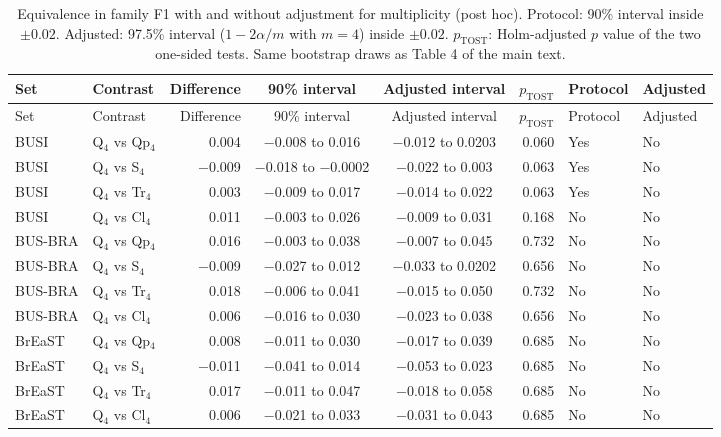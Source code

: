 \begin{longtable}{@{}llrccrll@{}}
\caption{Equivalence in family F1 with and without adjustment for multiplicity (post hoc). Protocol: 90\% interval inside $\pm0.02$. Adjusted: 97.5\% interval ($1-2\alpha/m$ with $m=4$) inside $\pm0.02$. $p_{\mathrm{TOST}}$: Holm-adjusted $p$ value of the two one-sided tests. Same bootstrap draws as Table 4 of the main text.}\label{stab:adjeq}\\
\toprule
Set & Contrast & Difference & 90\% interval & Adjusted interval & $p_{\mathrm{TOST}}$ & Protocol & Adjusted \\
\midrule
\endfirsthead
\toprule
Set & Contrast & Difference & 90\% interval & Adjusted interval & $p_{\mathrm{TOST}}$ & Protocol & Adjusted \\
\midrule
\endhead
BUSI & Q$_4$ vs Qp$_4$ & 0.004 & $-$0.008 to 0.016 & $-$0.012 to 0.0203 & 0.060 & Yes & No \\
BUSI & Q$_4$ vs S$_4$ & $-$0.009 & $-$0.018 to $-$0.0002 & $-$0.022 to 0.003 & 0.063 & Yes & No \\
BUSI & Q$_4$ vs Tr$_4$ & 0.003 & $-$0.009 to 0.017 & $-$0.014 to 0.022 & 0.063 & Yes & No \\
BUSI & Q$_4$ vs Cl$_4$ & 0.011 & $-$0.003 to 0.026 & $-$0.009 to 0.031 & 0.168 & No & No \\
BUS-BRA & Q$_4$ vs Qp$_4$ & 0.016 & $-$0.003 to 0.038 & $-$0.007 to 0.045 & 0.732 & No & No \\
BUS-BRA & Q$_4$ vs S$_4$ & $-$0.009 & $-$0.027 to 0.012 & $-$0.033 to 0.0202 & 0.656 & No & No \\
BUS-BRA & Q$_4$ vs Tr$_4$ & 0.018 & $-$0.006 to 0.041 & $-$0.015 to 0.050 & 0.732 & No & No \\
BUS-BRA & Q$_4$ vs Cl$_4$ & 0.006 & $-$0.016 to 0.030 & $-$0.023 to 0.038 & 0.656 & No & No \\
BrEaST & Q$_4$ vs Qp$_4$ & 0.008 & $-$0.011 to 0.030 & $-$0.017 to 0.039 & 0.685 & No & No \\
BrEaST & Q$_4$ vs S$_4$ & $-$0.011 & $-$0.041 to 0.014 & $-$0.053 to 0.023 & 0.685 & No & No \\
BrEaST & Q$_4$ vs Tr$_4$ & 0.017 & $-$0.011 to 0.047 & $-$0.018 to 0.058 & 0.685 & No & No \\
BrEaST & Q$_4$ vs Cl$_4$ & 0.006 & $-$0.021 to 0.033 & $-$0.031 to 0.043 & 0.685 & No & No \\
\bottomrule
\end{longtable}

